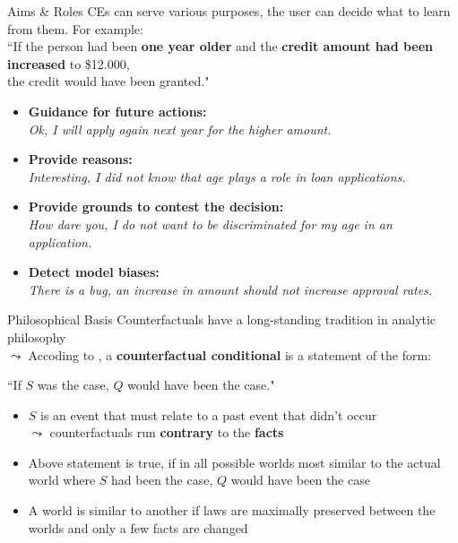 \documentclass[11pt,compress,t,notes=noshow, aspectratio=169, xcolor=table, usenames,dvipsnames]{beamer}
\begin{document}
\begin{frame}[c]{Aims \& Roles}
	CEs can serve various purposes, the user can decide what to learn from them.
	For example:  \\[0.2cm]
	``If the person had been \textbf{one year older} and the \textbf{credit amount had been increased} to \$12.000,\\ the credit would have been granted."  \\[0.2cm]
	\pause
	\begin{itemize}[<+->]
		\itemsep1.2em
		\item \textbf{Guidance for future actions:}\\ \textit{Ok, I will apply again next year for the higher amount.}
		\item \textbf{Provide reasons:}\\ \textit{Interesting, I did not know that age plays a role in loan applications.}
		\item \textbf{Provide grounds to contest the decision:}\\ \textit{How dare you, I do not want to be discriminated for my age in an application.}
		\item \textbf{Detect model biases:}\\ \textit{There is a bug, an increase in amount should not increase approval rates.}
	\end{itemize}
\end{frame}


\begin{frame}{Philosophical Basis}
Counterfactuals have a long-standing tradition in analytic philosophy\\
$\leadsto$ %
Accoding to , a \textbf{counterfactual conditional} is a statement of the form:

\begin{center}
``If $S$ was the case, $Q$ would have been the case."
\end{center}

\pause

	\begin{itemize}[<+->]
		\item $S$ is an event that must relate to a past event that didn't occur\\ $\leadsto$ counterfactuals run \textbf{contrary} to the \textbf{facts}
		\item Above statement is true, if in all possible worlds most similar to the actual world where $S$ had been the case, $Q$ would have been the case
		\item A world is similar to another if laws are maximally preserved between the worlds and only a few facts are changed
	\end{itemize}
\end{frame}
\end{document}
